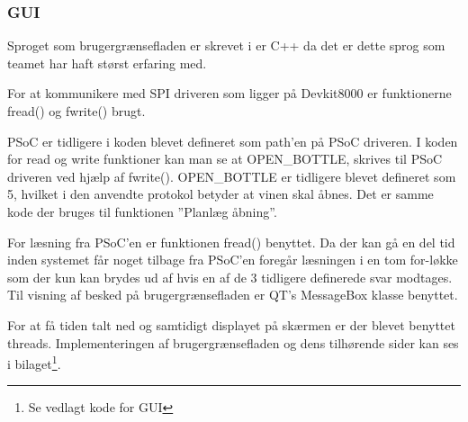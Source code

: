 \subsubsection{GUI}
Sproget som brugergrænsefladen er skrevet i er C++ da det er dette sprog som teamet har haft størst erfaring med.

For at kommunikere med SPI driveren som ligger på Devkit8000 er funktionerne fread() og fwrite() brugt. 

PSoC er tidligere i koden blevet defineret som path’en på PSoC driveren. I koden for read og write funktioner kan man se at OPEN\_BOTTLE, skrives til PSoC driveren ved hjælp af fwrite(). OPEN\_BOTTLE er tidligere blevet defineret som 5, hvilket i den anvendte protokol betyder at vinen skal åbnes. Det er samme kode der bruges til funktionen ”Planlæg åbning”. 

For læsning fra PSoC'en er funktionen fread() benyttet. Da der kan gå en del tid inden systemet får noget tilbage fra PSoC'en foregår læsningen i en tom for-løkke som der kun kan brydes ud af hvis en af de 3 tidligere definerede svar modtages. Til visning af besked på brugergrænsefladen er QT's MessageBox klasse benyttet. 

For at få tiden talt ned og samtidigt displayet på skærmen er der blevet benyttet threads. Implementeringen af brugergrænsefladen og dens tilhørende sider kan ses i bilaget\footnote{Se vedlagt kode for GUI}.
